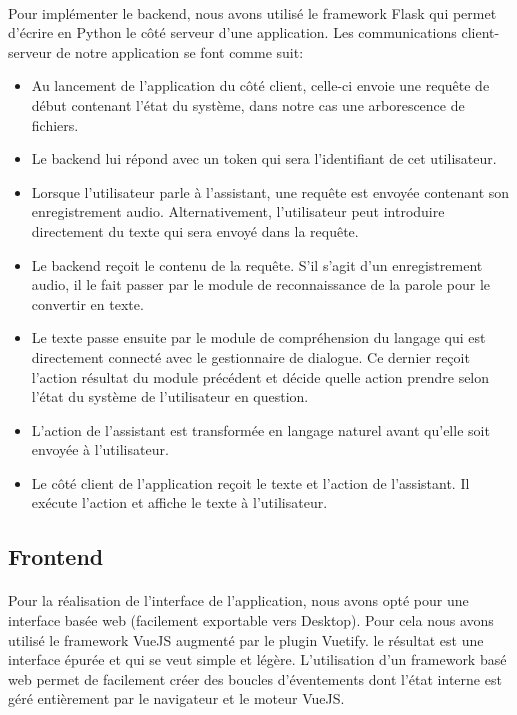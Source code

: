 \paragraph{}Pour implémenter le backend, nous avons utilisé le framework Flask qui permet d'écrire en Python le côté serveur d'une application. Les communications client-serveur de notre application se font comme suit:
\begin{itemize}
	\item Au lancement de l'application du côté client, celle-ci envoie une requête de début contenant l'état du système, dans notre cas une arborescence de fichiers. 
	\item Le backend lui répond avec un token qui sera l'identifiant de cet utilisateur.
	\item Lorsque l'utilisateur parle à l'assistant, une requête est envoyée contenant son enregistrement audio. Alternativement, l'utilisateur peut introduire directement du texte qui sera envoyé dans la requête.
	\item Le backend reçoit le contenu de la requête. S'il s'agit d'un enregistrement audio, il le fait passer par le module de reconnaissance de la parole pour le convertir en texte.
	\item Le texte passe ensuite par le module de compréhension du langage qui est directement connecté avec le gestionnaire de dialogue. Ce dernier reçoit l'action résultat du module précédent et décide quelle action prendre selon l'état du système de l'utilisateur en question.
	\item L'action de l'assistant est transformée en langage naturel avant qu'elle soit envoyée à l'utilisateur.
	\item Le côté client de l'application reçoit le texte et l'action de l'assistant. Il exécute l'action et affiche le texte à l'utilisateur.
\end{itemize}

\subsection{Frontend}
\paragraph{}
Pour la réalisation de l'interface de l'application, nous avons opté pour une interface basée web (facilement exportable vers Desktop). Pour cela nous avons utilisé le framework VueJS augmenté par le plugin Vuetify. le résultat est une interface épurée et qui se veut simple et légère. L'utilisation d'un framework basé web permet de facilement créer des boucles d'éventements dont l'état interne est géré entièrement par le navigateur et le moteur VueJS. 


